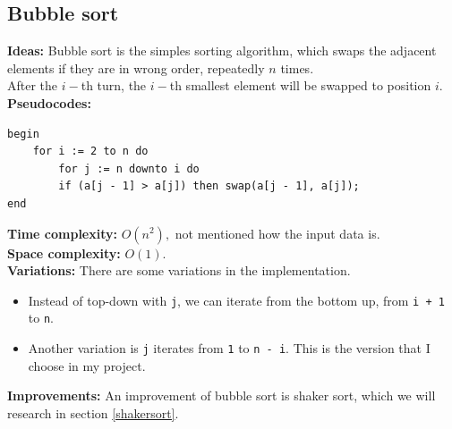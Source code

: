 \documentclass[12pt,a4paper]{article}
\begin{document}
\subsection{Bubble sort}
\textbf{Ideas:} Bubble sort is the simples sorting algorithm, which swaps the adjacent elements if they are in wrong order, repeatedly $n$ times.\\
After the $i-$th turn, the $i-$th smallest element will be swapped to position $i.$\\
\textbf{Pseudocodes:} \cite{gtvlt}
\lstset{language=Pascal} 
\begin{lstlisting}
begin
	for i := 2 to n do
		for j := n downto i do
		if (a[j - 1] > a[j]) then swap(a[j - 1], a[j]);
end
\end{lstlisting}
\textbf{Time complexity:} $O \left( {n^2} \right),$ not mentioned how the input data is. \cite{gtvlt}\\
\textbf{Space complexity:} $O \left( {1} \right).$ \cite{comp}\\
\textbf{Variations:} There are some variations in the implementation.
\begin{itemize}
\item Instead of top-down with \lstinline{j}, we can iterate from the bottom up, from \lstinline{i + 1} to \lstinline{n}.
\item Another variation is \lstinline{j} iterates from \lstinline{1} to \lstinline{n - i}. This is the version that I choose in my project.
\end{itemize}
\textbf{Improvements:} An improvement of bubble sort is shaker sort, which we will research in section \ref{shakersort}.
\end{document}
